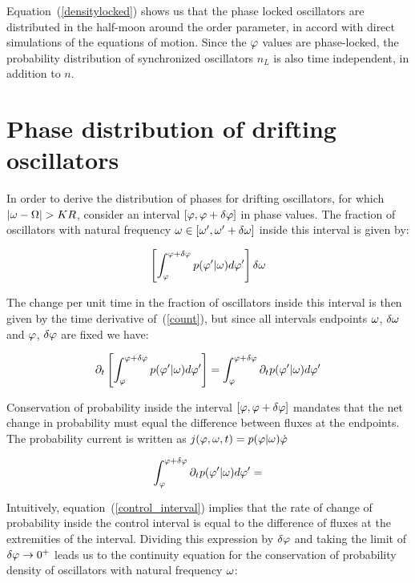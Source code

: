 Equation~(\ref{densitylocked}) shows us that the phase locked oscillators are distributed in the half-moon around the order parameter,
in accord with direct simulations of the equations of motion. Since the $\varphi$ values are phase-locked, the probability
distribution of synchronized oscillators $n_L$ is also time independent, in addition to $n$.

\section{Phase distribution of drifting oscillators}

In order to derive the distribution of phases for drifting oscillators, for which $|\omega - \Omega| > K R$, consider an interval
$[\varphi, \varphi + \delta \varphi ]$ in phase values. The fraction of oscillators with natural frequency $\omega \in [\omega',
\omega' + \delta\omega]$ inside this interval is given by:

\begin{align}
	\left[ \int_{\varphi}^{\varphi + \delta \varphi} p(\varphi' | \omega) d\varphi' \right] \delta \omega
	\label{count}
\end{align}

The change per unit time in the fraction of oscillators inside this interval is then given by the time derivative of~(\ref{count}), but
since all intervals endpoints $\omega$, $\delta\omega$ and $\varphi$, $\delta\varphi$ are fixed we have:

\begin{equation}
	\partial_t \left[ \int_{\varphi}^{\varphi + \delta \varphi} p(\varphi' | \omega) d\varphi' \right] =
	\int_{\varphi}^{\varphi + \delta \varphi}\partial_t p(\varphi' | \omega) d\varphi'
\end{equation}

\noindent Conservation of probability inside the interval $[\varphi,\varphi+\delta\varphi]$ mandates that the net change in
probability must equal the difference between fluxes at the endpoints. The probability current is written as $j(\varphi, \omega, t) =
p(\varphi|\omega)\dot{\varphi}$

\begin{align}
	\int_{\varphi}^{\varphi + \delta \varphi}\partial_t p(\varphi' | \omega) d\varphi' = 
	\label{control_interval}
\end{align}

Intuitively, equation~(\ref{control_interval}) implies that the rate of change of probability inside the control interval is equal to
the difference of fluxes at the extremities of the interval. Dividing this expression by $\delta\varphi$ and taking the limit of
$\delta\varphi \to 0^+$ leads us to the continuity equation for the conservation of probability density of oscillators with natural
frequency $\omega$:

